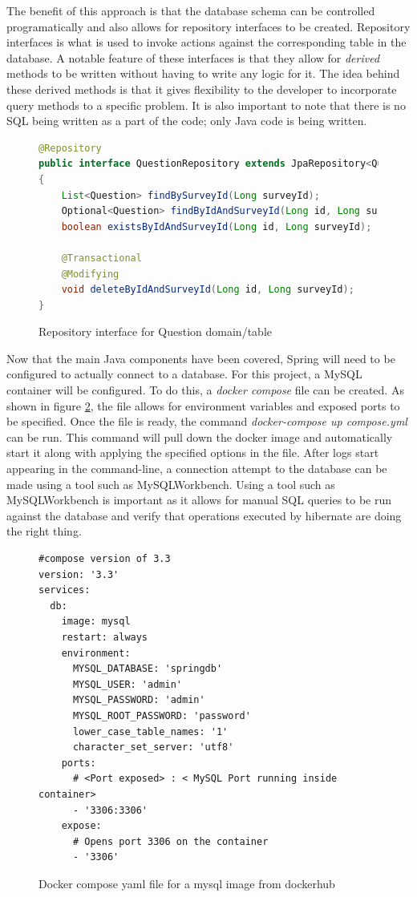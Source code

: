 The benefit of this approach is that the database schema can be controlled programatically and also allows for repository interfaces to be created.
Repository interfaces is what is used to invoke actions against the corresponding table in the database.
A notable feature of these interfaces is that they allow for \textit{derived} methods to be written without having to write any logic for it.
The idea behind these derived methods is that it gives flexibility to the developer to incorporate query methods to a specific problem.
It is also important to note that there is no SQL being written as a part of the code; only Java code is being written.


\begin{figure}[ht]
    \centering
    \begin{lstlisting}[language=Java]
@Repository
public interface QuestionRepository extends JpaRepository<Question,Long> 
{
    List<Question> findBySurveyId(Long surveyId);
    Optional<Question> findByIdAndSurveyId(Long id, Long surveyId);
    boolean existsByIdAndSurveyId(Long id, Long surveyId);

    @Transactional
    @Modifying
    void deleteByIdAndSurveyId(Long id, Long surveyId);
}
    \end{lstlisting}
    \caption{Repository interface for Question domain/table}
    \label{repo example}
\end{figure}


Now that the main Java components have been covered, Spring will need to be configured to actually connect to a database.
For this project, a MySQL container will be configured. To do this, a \textit{docker compose} file can be created.
As shown in figure \ref{sqldocker}, the file allows for environment variables and exposed ports to be specified.
Once the file is ready, the command \textit{docker-compose up compose.yml} can be run.
This command will pull down the docker image and automatically start it along with applying the specified options in the file.
After logs start appearing in the command-line, a connection attempt to the database can be made using a tool such as MySQLWorkbench.
Using a tool such as MySQLWorkbench is important as it allows for manual SQL queries to be run against the database and verify that operations
executed by hibernate are doing the right thing.


\begin{figure}[ht]
    \centering
    \begin{lstlisting}
#compose version of 3.3        
version: '3.3'
services:
  db:
    image: mysql
    restart: always
    environment:
      MYSQL_DATABASE: 'springdb'
      MYSQL_USER: 'admin'
      MYSQL_PASSWORD: 'admin'
      MYSQL_ROOT_PASSWORD: 'password'
      lower_case_table_names: '1'
      character_set_server: 'utf8'
    ports:
      # <Port exposed> : < MySQL Port running inside container>
      - '3306:3306'
    expose:
      # Opens port 3306 on the container
      - '3306'           
    \end{lstlisting}
    \caption{Docker compose yaml file for a mysql image from dockerhub}
    \label{sqldocker}
\end{figure}

